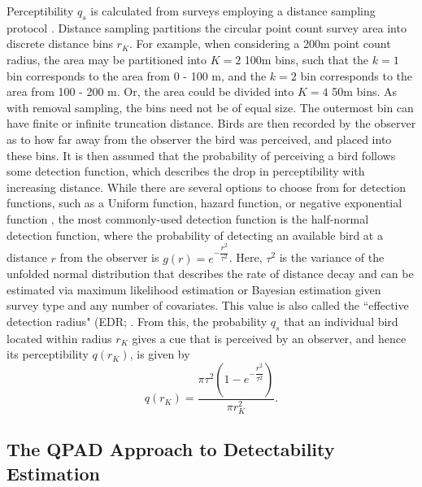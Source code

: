 \par Perceptibility $q_s$ is calculated from surveys employing a distance sampling protocol \citep{buckland_introduction_2001, buckland_distance_2015}. 
Distance sampling partitions the circular point count survey area into discrete distance bins $r_K$. 
For example, when considering a 200m point count radius, the area may be partitioned into $K = 2$ 100m bins, such that the $k = 1$ bin corresponds to the area from 0 - 100 m, and the $k = 2$ bin corresponds to the area from 100 - 200 m. 
Or, the area could be divided into $K = 4$ 50m bins. 
As with removal sampling, the bins need not be of equal size.
The outermost bin can have finite or infinite truncation distance.
Birds are then recorded by the observer as to how far away from the observer the bird was perceived, and placed into these bins.
It is then assumed that the probability of perceiving a bird follows some detection function, which describes the drop in perceptibility with increasing distance.
While there are several options to choose from for detection functions, such as a Uniform function, hazard function, or negative exponential function \citep{buckland_distance_2015}, the most commonly-used detection function is the half-normal detection function, where the probability of detecting an available bird at a distance $r$ from the observer is $g(r) = e^{-\dfrac{r^2}{\tau^2}}$. Here, $\tau^2$ is the variance of the unfolded normal distribution that describes the rate of distance decay and can be estimated via maximum likelihood estimation or Bayesian estimation given survey type and any number of covariates. 
This value is also called the ``effective detection radius" (EDR; \citet{buckland_introduction_2001}.
From this, the probability $q_s$ that an individual bird located within radius $r_K$ gives a cue that is perceived by an observer, and hence its perceptibility $q(r_K)$, is given by
\begin{equation*}
	q(r_K) = \dfrac{\pi \tau^2 \left(1 - e^{-\dfrac{r^2}{\tau^2}}\right)}{\pi r^2_K}.
\end{equation*}

\subsection{The QPAD Approach to Detectability Estimation}

